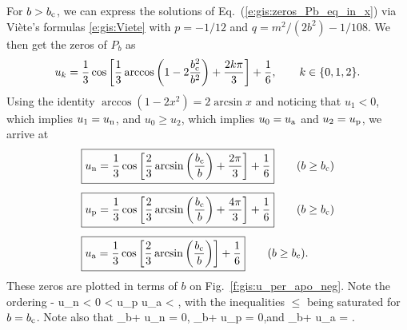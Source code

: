 For $b>b_{\rm c}$, we can express the solutions of Eq.~(\ref{e:gis:zeros_Pb_eq_in_x})
via Viète's formulas \eqref{e:gis:Viete}
with $p = -1/12$ and $q = m^2/(2b^2) - 1/108$.
We then get the zeros of $P_b$ as
\[
    u_k = \frac{1}{3} \cos \left[ \frac{1}{3}
        \arccos \left( 1 - 2 \frac{b_{\rm c}^2}{b^2} \right) + \frac{2 k \pi}{3} \right]
        + \frac{1}{6},
        \qquad k \in \{0, 1, 2\} .
\]
Using the identity $\arccos(1 - 2 x^2) = 2\arcsin x$ and noticing
that $u_1 < 0$, which implies $u_1 = u_{\rm n}$, and $u_ 0 \geq u_2$, which
implies $u_0 = u_{\rm a}$ and $u_2 = u_{\rm p}$,
we arrive at
\begin{subequations}
\label{e:gis:zeros_Pbu}
\begin{align}
  &  \fbox{$\displaystyle u_{\rm n} = \frac{1}{3}\cos\left[ \frac{2}{3} \arcsin\left(
   \frac{b_{\rm c}}{b}\right) + \frac{2\pi}{3}\right] + \frac{1}{6} $} \qquad (b \geq b_{\rm c}) \label{e:gis:u_n_b_gt_bc}\\[1ex]
 & \fbox{$\displaystyle  u_{\rm p} = \frac{1}{3}\cos\left[ \frac{2}{3} \arcsin\left(
   \frac{b_{\rm c}}{b}\right) + \frac{4\pi}{3}\right] + \frac{1}{6} $}
            \qquad (b \geq b_{\rm c}) \label{e:gis:u_per_b}  \\[1ex]
 & \fbox{$\displaystyle  u_{\rm a} = \frac{1}{3}\cos\left[ \frac{2}{3} \arcsin\left(
   \frac{b_{\rm c}}{b}\right) \right] + \frac{1}{6} $}  \qquad (b \geq b_{\rm c}) .
   \label{e:gis:u_apo_b}
\end{align}
\end{subequations}
These zeros are plotted in terms of $b$ on Fig.~\ref{f:gis:u_per_apo_neg}.
Note the ordering
\be \label{e:gis:order_u_zeros}
    - \leq u_{\rm n} < 0 < u_{\rm p} \leq {}
    \leq u_{\rm a} <  ,
\ee
with the inequalities $\leq$ being saturated for $b = b_{\rm c}$.
Note also that
\be \label{e:gis:lim_b_inf_u_zeros}
    \lim_{b\to +\infty} u_{\rm n} = 0,\qquad
    \lim_{b\to +\infty} u_{\rm p} = 0,\qquad\mbox{and}\qquad
    \lim_{b\to +\infty} u_{\rm a} =  .
\ee

